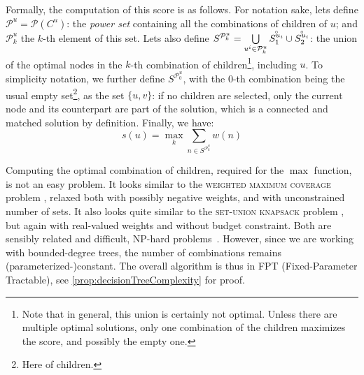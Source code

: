 			Formally, the computation of this score is as follows.
			For notation sake, lets define $\mathcal{P}^u = \mathcal{P}\left({C^u}\right)$: the \emph{power set} containing all the combinations of children of $u$; and $\mathcal{P}^u_k$ the $k$-th element of this set.
			Lets also define $S^{\mathcal{P}^u_k} = \bigcup\limits_{u^i \in \mathcal{P}^u_k}{\accentset{\circ}{S^{u_i}_1} \cup \accentset{\circ}{S^{u_i}_2}}$: the union of the optimal nodes in the $k$-th combination of children\footnote{Note that in general, this union is certainly not optimal. Unless there are multiple optimal solutions, only one combination of the children maximizes the score, and possibly the empty one.}, including $u$.
			To simplicity notation, we further define $S^{\mathcal{P}^u_0}$, with the $0$-th combination being the usual empty set\footnote{Here of children.}, as the set $\{u, v\}$: if no children are selected, only the current node and its counterpart are part of the solution, which is a connected and matched solution by definition.
			Finally, we have:
			\[
				s(u) = \max\limits_{k}{\sum\limits_{n \in S^{\mathcal{P}^u_k}}{w\left(n\right)}}
			\]

			Computing the optimal combination of children, required for the $\max$ function, is not an easy problem.
			It looks similar to the \textsc{weighted maximum coverage} problem \parencite{hochbaum1996approximation}, relaxed both with possibly negative weights, and with unconstrained number of sets.
			It also looks quite similar to the \textsc{set-union knapsack} problem \parencite{goldschmidt1994note}, but again with real-valued weights and without budget constraint.
			Both are sensibly related and difficult, NP-hard problems~\parencites{hochbaum1996approximation,cohen2008generalized}.
			However, since we are working with bounded-degree trees, the number of combinations remains (parameterized-)constant. The overall algorithm is thus in FPT (Fixed-Parameter Tractable), see \cref{prop:decisionTreeComplexity} for proof.

